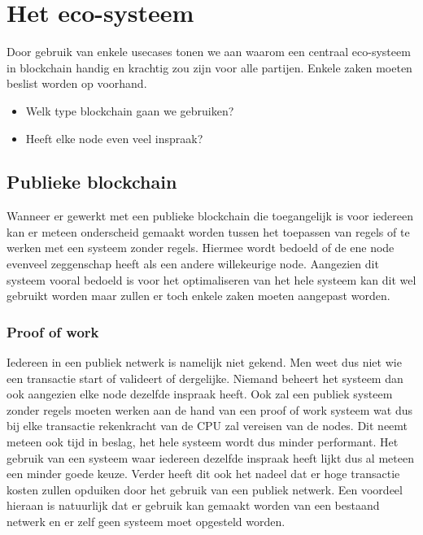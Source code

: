 \chapter{Het eco-systeem}
\label{ch:eco-system}
Door gebruik van enkele usecases tonen we aan waarom een centraal eco-systeem in blockchain handig en krachtig zou zijn voor alle partijen. Enkele zaken moeten beslist worden op voorhand. 

\begin{itemize}
	\item Welk type blockchain gaan we gebruiken?
	\item Heeft elke node even veel inspraak?
\end{itemize}

\section{Publieke blockchain}
Wanneer er  gewerkt met een publieke blockchain die toegangelijk is voor iedereen kan er meteen onderscheid gemaakt worden tussen het toepassen van regels of te werken met een systeem zonder regels. Hiermee wordt bedoeld of de ene node evenveel zeggenschap heeft als een andere willekeurige node. Aangezien dit systeem vooral bedoeld is voor het optimaliseren van het hele systeem kan dit wel gebruikt worden maar zullen er toch enkele zaken moeten aangepast worden.

\subsection{Proof of work}
Iedereen in een publiek netwerk is namelijk niet gekend. Men weet dus niet wie een transactie start of valideert of dergelijke. Niemand beheert het systeem dan ook aangezien elke node dezelfde inspraak heeft. Ook zal een publiek systeem zonder regels moeten werken aan de hand van een proof of work systeem wat dus bij elke transactie rekenkracht van de CPU zal vereisen van de nodes. Dit neemt meteen ook tijd in beslag, het hele systeem wordt dus minder performant. Het gebruik van een systeem waar iedereen dezelfde inspraak heeft lijkt dus al meteen een minder goede keuze. Verder heeft dit ook het nadeel dat er hoge transactie kosten zullen opduiken door het gebruik van een publiek netwerk. Een voordeel hieraan is natuurlijk dat er gebruik kan gemaakt worden van een bestaand netwerk en er zelf geen systeem moet opgesteld worden. 

